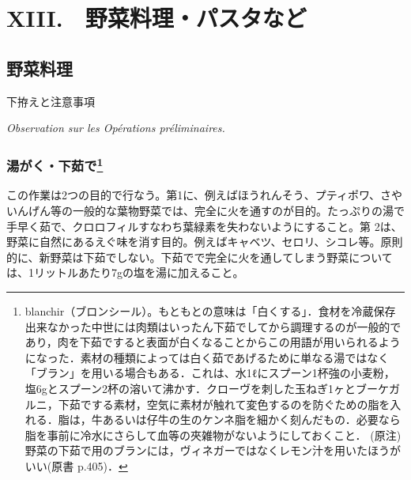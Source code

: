 \href{未、原文対照チェック}{} \href{未、日本語表現校正}{}
\href{未、その他修正}{} \href{未、原稿最終校正}{}

\hypertarget{legumes-farineux-et-pates-alimentaires}{%
\chapter{XIII.　野菜料理・パスタなど}\label{legumes-farineux-et-pates-alimentaires}}


\hypertarget{serie-des-legumes}{%
\section{野菜料理}\label{serie-des-legumes}}

\begin{center}
\headfont\large 下拵えと注意事項\label{observations-sur-les-operations-preliminaires}

\normalfont\textit{Observation sur les Opérations préliminaires.}
\end{center}

\normalfont\normalsize

\hypertarget{blanchissage}{%
\subsection[湯がく・下茹で]{\texorpdfstring{湯がく・下茹で\footnote{blanchir（ブロンシール）。もともとの意味は「白くする」．食材を冷蔵保存出来なかった中世には肉類はいったん下茹でしてから調理するのが一般的であり，肉を下茹ですると表面が白くなることからこの用語が用いられるようになった．素材の種類によっては白く茹であげるために単なる湯ではなく「ブラン」を用いる場合もある．これは、水1ℓにスプーン1杯強の小麦粉，塩6gとスプーン2杯の溶いて沸かす．クローヴを刺した玉ねぎ1ヶとブーケガルニ，下茹でする素材，空気に素材が触れて変色するのを防ぐための脂を入れる．脂は，牛あるいは仔牛の生のケンネ脂を細かく刻んだもの．必要なら脂を事前に冷水にさらして血等の夾雑物がないようにしておくこと．
  (原注)
  野菜の下茹で用のブランには，ヴィネガーではなくレモン汁を用いたほうがいい(原書
  p.405)．}}{湯がく・下茹で}}\label{blanchissage}}

この作業は2つの目的で行なう。第1に、例えばほうれんそう、プティポワ、さやいんげん等の一般的な葉物野菜では、完全に火を通すのが目的。たっぷりの湯で手早く茹で、クロロフィルすなわち葉緑素を失わないようにすること。第
2は、野菜に自然にあるえぐ味を消す目的。例えばキャベツ、セロリ、シコレ等。原則的に、新野菜は下茹でしない。下茹でで完全に火を通してしまう野菜については、1リットルあたり7gの塩を湯に加えること。

